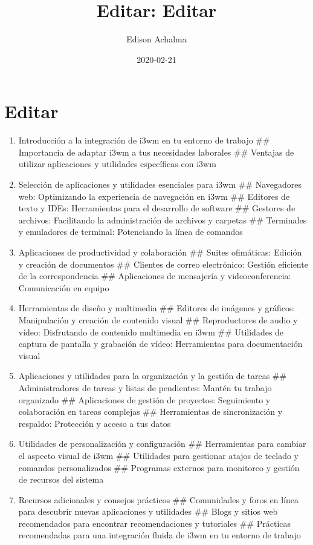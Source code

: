 \documentclass[
  jou,
  floatsintext,
  longtable,
  a4paper,
  nolmodern,
  notxfonts,
  notimes,
  colorlinks=true,linkcolor=blue,citecolor=blue,urlcolor=blue]{apa7}
\title{Editar: Editar}
\author{Edison Achalma}
\affiliation{
{Escuela Profesional de Economía, Universidad Nacional de San Cristóbal
de Huamanga}}
\date{2020-02-21}
\begin{document}
\maketitle

\hypertarget{toc}{}
\tableofcontents
\newpage
\section[Introduction]{Editar}

\setcounter{secnumdepth}{5}

\setlength\LTleft{0pt}


\begin{enumerate}
\def\labelenumi{\arabic{enumi}.}
\item
  Introducción a la integración de i3wm en tu entorno de trabajo \#\#
  Importancia de adaptar i3wm a tus necesidades laborales \#\# Ventajas
  de utilizar aplicaciones y utilidades específicas con i3wm
\item
  Selección de aplicaciones y utilidades esenciales para i3wm \#\#
  Navegadores web: Optimizando la experiencia de navegación en i3wm \#\#
  Editores de texto y IDEs: Herramientas para el desarrollo de software
  \#\# Gestores de archivos: Facilitando la administración de archivos y
  carpetas \#\# Terminales y emuladores de terminal: Potenciando la
  línea de comandos
\item
  Aplicaciones de productividad y colaboración \#\# Suites ofimáticas:
  Edición y creación de documentos \#\# Clientes de correo electrónico:
  Gestión eficiente de la correspondencia \#\# Aplicaciones de
  mensajería y videoconferencia: Comunicación en equipo
\item
  Herramientas de diseño y multimedia \#\# Editores de imágenes y
  gráficos: Manipulación y creación de contenido visual \#\#
  Reproductores de audio y vídeo: Disfrutando de contenido multimedia en
  i3wm \#\# Utilidades de captura de pantalla y grabación de vídeo:
  Herramientas para documentación visual
\item
  Aplicaciones y utilidades para la organización y la gestión de tareas
  \#\# Administradores de tareas y listas de pendientes: Mantén tu
  trabajo organizado \#\# Aplicaciones de gestión de proyectos:
  Seguimiento y colaboración en tareas complejas \#\# Herramientas de
  sincronización y respaldo: Protección y acceso a tus datos
\item
  Utilidades de personalización y configuración \#\# Herramientas para
  cambiar el aspecto visual de i3wm \#\# Utilidades para gestionar
  atajos de teclado y comandos personalizados \#\# Programas externos
  para monitoreo y gestión de recursos del sistema
\item
  Recursos adicionales y consejos prácticos \#\# Comunidades y foros en
  línea para descubrir nuevas aplicaciones y utilidades \#\# Blogs y
  sitios web recomendados para encontrar recomendaciones y tutoriales
  \#\# Prácticas recomendadas para una integración fluida de i3wm en tu
  entorno de trabajo
\end{enumerate}
\end{document}

